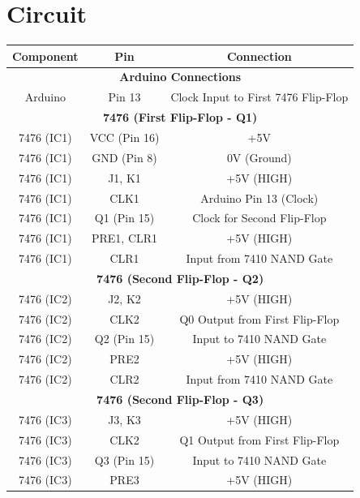 \documentclass[12pt,a4paper]{article}
\begin{document}
\section{Circuit}
\begin{table}[H]
    \centering
    \renewcommand{\arraystretch}{1.2}
    \begin{tabular}{|c|c|c|}
        \hline
        \textbf{Component} & \textbf{Pin} & \textbf{Connection} \\
        \hline
        \multicolumn{3}{|c|}{\textbf{Arduino Connections}} \\
        \hline
        Arduino & Pin 13 & Clock Input to First 7476 Flip-Flop \\
        \hline
        \multicolumn{3}{|c|}{\textbf{7476 (First Flip-Flop - Q1)}} \\
        \hline
        7476 (IC1) & VCC (Pin 16) & +5V \\
        7476 (IC1) & GND (Pin 8) & 0V (Ground) \\
        7476 (IC1) & J1, K1 & +5V (HIGH) \\
        7476 (IC1) & CLK1 & Arduino Pin 13 (Clock) \\
        7476 (IC1) & Q1 (Pin 15) & Clock for Second Flip-Flop \\
        7476 (IC1) & PRE1, CLR1 & +5V (HIGH) \\
        7476 (IC1) & CLR1 & Input from 7410 NAND Gate\\
        \hline
        \multicolumn{3}{|c|}{\textbf{7476 (Second Flip-Flop - Q2)}} \\
        \hline
        7476 (IC2) & J2, K2 & +5V (HIGH) \\
        7476 (IC2) & CLK2 & Q0 Output from First Flip-Flop \\
        7476 (IC2) & Q2 (Pin 15) & Input to 7410 NAND Gate \\
        7476 (IC2) & PRE2 & +5V (HIGH) \\
        7476 (IC2) & CLR2 & Input from 7410 NAND Gate\\
        \hline
        \multicolumn{3}{|c|}{\textbf{7476 (Second Flip-Flop - Q3)}} \\
        \hline
        7476 (IC3) & J3, K3 & +5V (HIGH) \\
        7476 (IC3) & CLK2 & Q1 Output from First Flip-Flop \\
        7476 (IC3) & Q3 (Pin 15) & Input to 7410 NAND Gate \\
        7476 (IC3) & PRE3 & +5V (HIGH) \\

\end{tabular}
\end{table}
\end{document}
